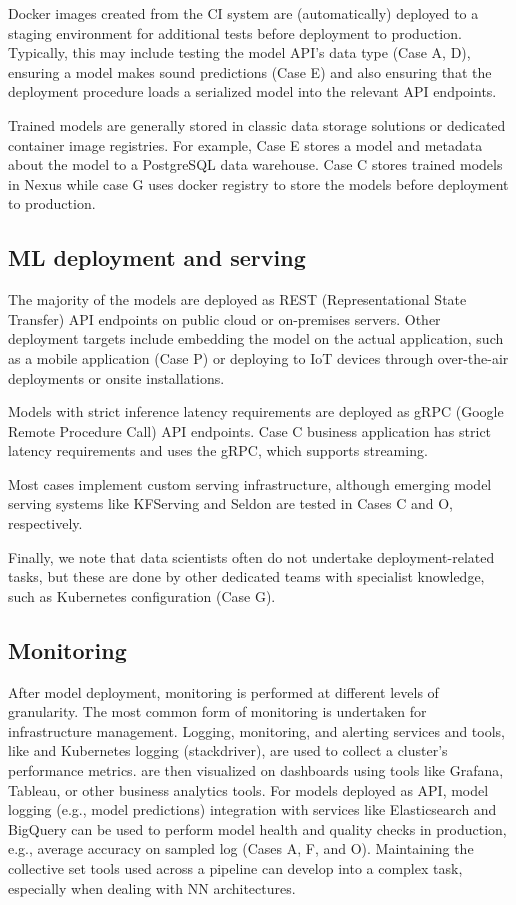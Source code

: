 Docker images created from the CI system are (automatically) deployed to a staging environment for additional tests before deployment to production. Typically, this may include testing the model API's data type (Case A, D), ensuring a model makes sound predictions (Case E) and also ensuring that the deployment procedure loads a serialized model into the relevant API endpoints.

Trained models are generally stored in classic data storage solutions or dedicated container image registries. For example, Case E stores a model and metadata about the model to a PostgreSQL data warehouse. Case C stores trained models in Nexus while case G uses docker registry to store the models before deployment to production.



\subsection{ML deployment and serving}
The majority of the models are deployed as REST (Representational State Transfer) API endpoints on public cloud or on-premises servers. Other deployment targets include embedding the model on the actual application, such as a mobile application (Case P) or deploying to IoT devices through over-the-air deployments or onsite installations.

Models with strict inference latency requirements are deployed as gRPC (Google Remote Procedure Call) API endpoints. Case C business application has strict latency requirements and uses the gRPC, which supports streaming.

Most cases implement custom serving infrastructure, although emerging model serving systems like KFServing and Seldon are tested in Cases C and O, respectively. 

Finally, we note that data scientists often do not undertake deployment-related tasks, but these are done by other dedicated teams with specialist knowledge, such as Kubernetes configuration (Case G).

\subsection{Monitoring}
After model deployment, monitoring is performed at different levels of granularity. The most common form of monitoring is undertaken for infrastructure management. Logging, monitoring, and alerting services and tools, like \DIFdelbegin {}\DIFdelend \DIFaddbegin {}\DIFaddend and Kubernetes logging (stackdriver), are used to collect a cluster's performance metrics. \DIFdelbegin {}\DIFdelend \DIFaddbegin {}\DIFaddend are then visualized on dashboards using tools like Grafana, Tableau, or other business analytics tools. For models deployed as API, model logging (e.g., model predictions) integration with services like Elasticsearch and BigQuery can be used to perform model health and quality checks in production, e.g., average accuracy on sampled log (Cases A, F, and O).
Maintaining the collective set tools used across a pipeline can develop into a complex task, especially when dealing with NN architectures.


